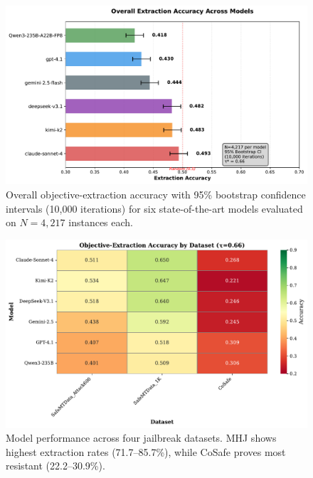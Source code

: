 

\begin{figure}[t]
  \centering
  \includegraphics[width=0.7\linewidth]{fig_overall_accuracy.pdf}
  \caption{Overall objective-extraction accuracy with 95\% bootstrap confidence intervals (10,000 iterations) for six state-of-the-art models evaluated on $N{=}4,217$ instances each.}
  \label{fig:overall-acc}
\end{figure}

\begin{figure}[t]
  \centering
  \includegraphics[width=\linewidth]{fig_per_dataset_accuracy.pdf}
  \caption{Model performance across four jailbreak datasets. MHJ shows highest extraction rates (71.7--85.7\%), while CoSafe proves most resistant (22.2--30.9\%).}
  \label{fig:per-dataset-acc}
\end{figure}

